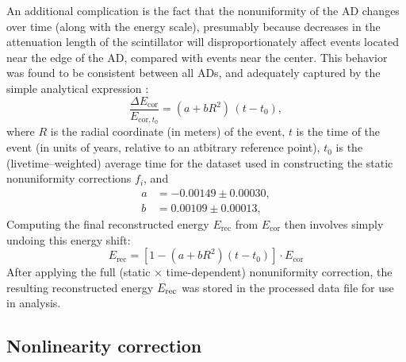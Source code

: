 \documentclass[../thesis.tex]{subfiles}
\begin{document}
An additional complication is the fact that the nonuniformity of the AD changes over time (along with the energy scale), presumably because decreases in the attenuation length of the scintillator will disproportionately affect events located near the edge of the AD, compared with events near the center. This behavior was found to be consistent between all ADs, and adequately captured by the simple analytical expression \cite[p. 16]{yuryNonUni2}:
\begin{equation}
  \frac{\Delta E_{\mathrm{cor}}}{E_{\mathrm{cor},t_0}} = (a + b R^2)\, (t - t_0),
\end{equation}
where $R$ is the radial coordinate (in meters) of the event, $t$ is the time of the event (in units of years, relative to an atbitrary reference point), $t_0$ is the (livetime--weighted) average time for the dataset used in constructing the static nonuniformity corrections $f_i$, and
\begin{align*}
  a &= -0.00149 \pm 0.00030,\\
  b &= 0.00109 \pm 0.00013,
\end{align*}
Computing the final reconstructed energy $E_{\mathrm{rec}}$ from $E_{\mathrm{cor}}$ then involves simply undoing this energy shift:
\begin{equation}
  E_{\mathrm{rec}} = \left[ 1 - (a + b R^2) (t - t_0) \right] \cdot E_{\mathrm{cor}}
\end{equation}
After applying the full (static $\times$ time-dependent) nonuniformity correction, the resulting reconstructed energy $E_\mathrm{rec}$ was stored in the processed data file for use in analysis.

\subsection{Nonlinearity correction}
\label{sec:reconEnergyNL}
\end{document}
